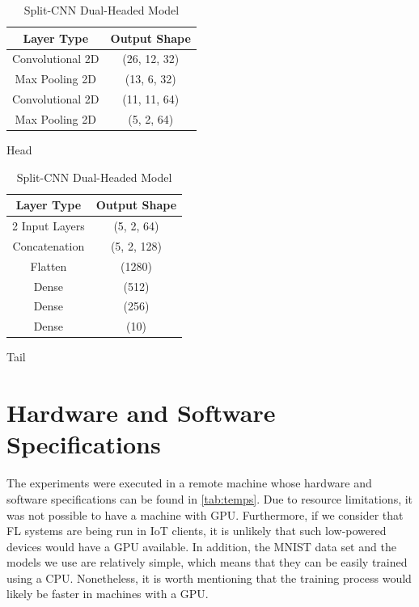 \begin{table}[!h]
    \begin{subtable}[h]{0.49\textwidth}
        \centering
        \begin{tabular}{c|c}
            \hline \hline
            Layer Type       & Output Shape \\ \hline \hline
            Convolutional 2D & (26, 12, 32) \\ \hline
            Max Pooling 2D   & (13, 6, 32) \\ \hline
            Convolutional 2D & (11, 11, 64) \\ \hline
            Max Pooling 2D   & (5, 2, 64)   \\ \hline
        \end{tabular}
        \caption{Head}
    \end{subtable}
    \hfill
    \begin{subtable}[h]{0.49\textwidth}
        \centering
        \begin{tabular}{c|c}
            \hline\hline
            Layer Type     & Output Shape \\ \hline\hline
            2 Input Layers & (5, 2, 64)   \\ \hline
            Concatenation  & (5, 2, 128)  \\ \hline
            Flatten        & (1280)       \\ \hline
            Dense          & (512)        \\ \hline
            Dense          & (256)        \\ \hline
            Dense          & (10)         \\ \hline
        \end{tabular}
        \caption{Tail}
     \end{subtable}
     \caption{Split-CNN Dual-Headed Model}
     \label{tab:splitnn}
\end{table}

\section{Hardware and Software Specifications}

The experiments were executed in a remote machine whose hardware and software specifications can be found in \autoref{tab:temps}. Due to resource limitations, it was not possible to have a machine with GPU. Furthermore, if we consider that FL systems are being run in IoT clients, it is unlikely that such low-powered devices would have a GPU available. In addition, the MNIST data set and the models we use are relatively simple, which means that they can be easily trained using a CPU. Nonetheless, it is worth mentioning that the training process would likely be faster in machines with a GPU.


